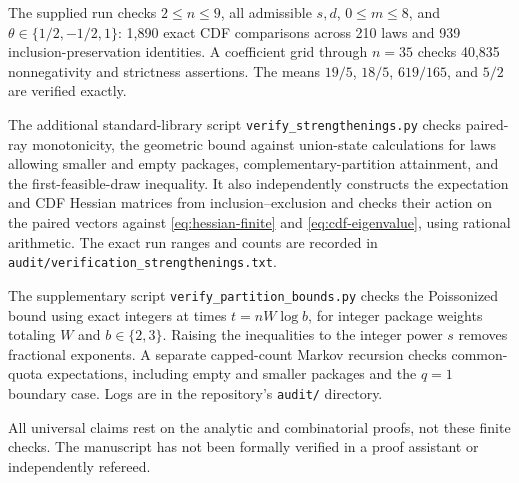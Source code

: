 \documentclass[11pt]{article}
\numberwithin{equation}{section}
\theoremstyle{remark}
\newcommand{\1}{\mathbf 1}
\begin{document}
The supplied run checks $2\leq n\leq9$, all admissible $s,d$, $0\leq m\leq8$, and $\theta\in\{1/2,-1/2,1\}$: 1,890 exact CDF comparisons across 210 laws and 939 inclusion-preservation identities. A coefficient grid through $n=35$ checks 40,835 nonnegativity and strictness assertions. The means $19/5$, $18/5$, $619/165$, and $5/2$ are verified exactly.

The additional standard-library script \texttt{verify\_strengthenings.py} checks paired-ray monotonicity, the geometric bound against union-state calculations for laws allowing smaller and empty packages, complementary-partition attainment, and the first-feasible-draw inequality. It also independently constructs the expectation and CDF Hessian matrices from inclusion--exclusion and checks their action on the paired vectors against \eqref{eq:hessian-finite} and \eqref{eq:cdf-eigenvalue}, using rational arithmetic. The exact run ranges and counts are recorded in \texttt{audit/verification\_strengthenings.txt}.

The supplementary script \texttt{verify\_partition\_bounds.py} checks the Poissonized bound using exact integers at times $t=nW\log b$, for integer package weights totaling $W$ and $b\in\{2,3\}$. Raising the inequalities to the integer power $s$ removes fractional exponents. A separate capped-count Markov recursion checks common-quota expectations, including empty and smaller packages and the $q=1$ boundary case. Logs are in the repository's \texttt{audit/} directory.

All universal claims rest on the analytic and combinatorial proofs, not these finite checks. The manuscript has not been formally verified in a proof assistant or independently refereed.
\end{document}
